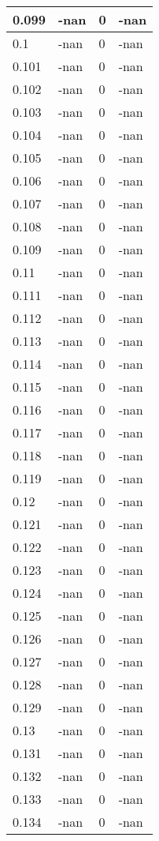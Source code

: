 \documentclass[a4paper,14pt]{extarticle}
\begin{document}
\begin{longtable}{||m{3cm}||m{3cm}|m{3cm}||m{3cm}||}
\hline
0.099 & -nan & 0 & -nan\\
\hline
0.1 & -nan & 0 & -nan\\
\hline
0.101 & -nan & 0 & -nan\\
\hline
0.102 & -nan & 0 & -nan\\
\hline
0.103 & -nan & 0 & -nan\\
\hline
0.104 & -nan & 0 & -nan\\
\hline
0.105 & -nan & 0 & -nan\\
\hline
0.106 & -nan & 0 & -nan\\
\hline
0.107 & -nan & 0 & -nan\\
\hline
0.108 & -nan & 0 & -nan\\
\hline
0.109 & -nan & 0 & -nan\\
\hline
0.11 & -nan & 0 & -nan\\
\hline
0.111 & -nan & 0 & -nan\\
\hline
0.112 & -nan & 0 & -nan\\
\hline
0.113 & -nan & 0 & -nan\\
\hline
0.114 & -nan & 0 & -nan\\
\hline
0.115 & -nan & 0 & -nan\\
\hline
0.116 & -nan & 0 & -nan\\
\hline
0.117 & -nan & 0 & -nan\\
\hline
0.118 & -nan & 0 & -nan\\
\hline
0.119 & -nan & 0 & -nan\\
\hline
0.12 & -nan & 0 & -nan\\
\hline
0.121 & -nan & 0 & -nan\\
\hline
0.122 & -nan & 0 & -nan\\
\hline
0.123 & -nan & 0 & -nan\\
\hline
0.124 & -nan & 0 & -nan\\
\hline
0.125 & -nan & 0 & -nan\\
\hline
0.126 & -nan & 0 & -nan\\
\hline
0.127 & -nan & 0 & -nan\\
\hline
0.128 & -nan & 0 & -nan\\
\hline
0.129 & -nan & 0 & -nan\\
\hline
0.13 & -nan & 0 & -nan\\
\hline
0.131 & -nan & 0 & -nan\\
\hline
0.132 & -nan & 0 & -nan\\
\hline
0.133 & -nan & 0 & -nan\\
\hline
0.134 & -nan & 0 & -nan\\

\end{longtable}
\end{document}
